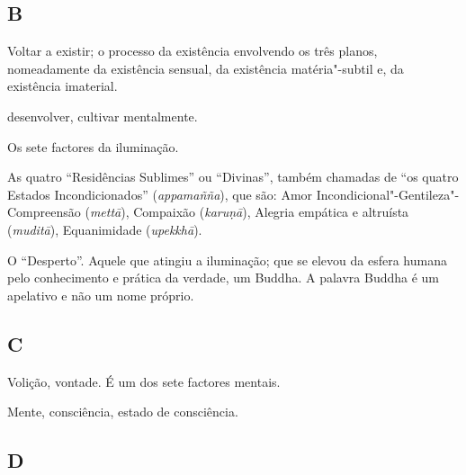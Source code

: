 \subsection{B}

\begin{glossarydescription}

\item[Bhava] Voltar a existir; o processo da existência envolvendo os três planos, nomeadamente da existência sensual, da existência matéria"-subtil e, da existência imaterial.

\item[Bhāvanā] desenvolver, cultivar mentalmente.

\item[Bojjhaṅga] Os sete factores da iluminação.

\item[Brahma"-Vihāra] As quatro ``Residências Sublimes'' ou ``Divinas'', também
chamadas de ``os quatro Estados Incondicionados'' (\emph{appamañña}), que são:
Amor Incondicional"-Gentileza"-Compreensão (\emph{mettā}), Compaixão
(\emph{karuṇā}), Alegria empática e altruísta (\emph{muditā}), Equanimidade
(\emph{upekkhā}).

\item[Buddha] O ``Desperto''. Aquele que atingiu a iluminação; que se elevou da
esfera humana pelo conhecimento e prática da verdade, um Buddha. A palavra
Buddha é um apelativo e não um nome próprio.

\end{glossarydescription}

\subsection{C}

\begin{glossarydescription}

\item[Cetanā] Volição, vontade. É um dos sete factores mentais.

\item[Citta] Mente, consciência, estado de consciência.

\end{glossarydescription}

\subsection{D}

